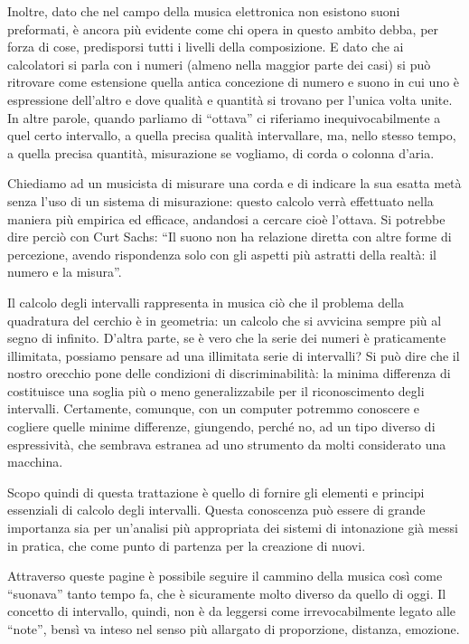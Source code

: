 Inoltre, dato che nel campo della musica elettronica non esistono suoni
preformati, è ancora più evidente come chi opera in questo ambito debba, per
forza di cose, predisporsi tutti i livelli della composizione. E dato che ai
calcolatori si parla con i numeri (almeno nella maggior parte dei casi) si può
ritrovare come estensione quella antica concezione di numero e suono in cui uno
è espressione dell'altro e dove qualità e quantità si trovano per l'unica volta
unite. In altre parole, quando parliamo di \enquote{ottava} ci riferiamo
inequivocabilmente a quel certo intervallo, a quella precisa qualità
intervallare, ma, nello stesso tempo, a quella precisa quantità, misurazione se
vogliamo, di corda o colonna d'aria.

Chiediamo ad un musicista di misurare una corda e di indicare la sua esatta metà
senza l'uso di un sistema di misurazione: questo calcolo verrà effettuato nella
maniera più empirica ed efficace, andandosi a cercare cioè l'ottava. Si potrebbe
dire perciò con Curt Sachs: \enquote{Il suono non ha relazione diretta con altre
forme di percezione, avendo rispondenza solo con gli aspetti più astratti della
realtà: il numero e la misura}.

Il calcolo degli intervalli rappresenta in musica ciò che il problema della
quadratura del cerchio è in geometria: un calcolo che si avvicina sempre più al
segno di infinito. D'altra parte, se è vero che la serie dei numeri è
praticamente illimitata, possiamo pensare ad una illimitata serie di intervalli?
Si può dire che il nostro orecchio pone delle condizioni di discriminabilità: la
minima differenza di  costituisce una soglia più o meno generalizzabile
per il riconoscimento degli intervalli. Certamente, comunque, con un computer
potremmo conoscere e cogliere quelle minime differenze, giungendo, perché no, ad
un tipo diverso di espressività, che sembrava estranea ad uno strumento da molti
considerato una macchina.

Scopo quindi di questa trattazione è quello di fornire gli elementi e principi
essenziali di calcolo degli intervalli. Questa conoscenza può essere di grande
importanza sia per un'analisi più appropriata dei sistemi di intonazione già
messi in pratica, che come punto di partenza per la creazione di nuovi.

Attraverso queste pagine è possibile seguire il cammino della musica così come
\enquote{suonava} tanto tempo fa, che è sicuramente molto diverso da quello di
oggi. Il concetto di intervallo, quindi, non è da leggersi come irrevocabilmente
legato alle \enquote{note}, bensì va inteso nel senso più allargato di
proporzione, distanza, emozione.

